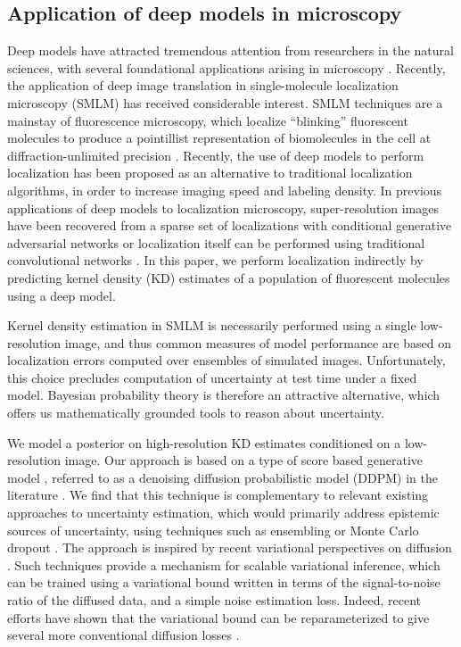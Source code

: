 \subsection{Application of deep models in microscopy}

Deep models have attracted tremendous attention from researchers in the natural sciences, with several foundational applications arising in microscopy \parencite{Weigert2018,Falk2019}. Recently, the application of deep image translation in single-molecule localization microscopy (SMLM) has received considerable interest. SMLM techniques are a mainstay of fluorescence microscopy, which localize ``blinking'' fluorescent molecules to produce a pointillist representation of biomolecules in the cell at diffraction-unlimited precision \parencite{Rust2006,Betzig2006}. Recently, the use of deep models to perform localization has been proposed as an alternative to traditional localization algorithms, in order to increase imaging speed and labeling density. In previous applications of deep models to localization microscopy, super-resolution images have been recovered from a sparse set of localizations with conditional generative adversarial networks \parencite{Ouyang2018} or localization itself can be performed using traditional convolutional networks \parencite{Nehme2020,Speiser2021}. In this paper, we perform localization indirectly by predicting kernel density (KD) estimates of a population of fluorescent molecules using a deep model. 

Kernel density estimation in SMLM is necessarily performed using a single low-resolution image, and thus common measures of model performance are based on localization errors computed over ensembles of simulated images. Unfortunately, this choice precludes computation of uncertainty at test time under a fixed model. Bayesian probability theory is therefore an attractive alternative, which offers us mathematically grounded tools to reason about uncertainty. 

We model a posterior on high-resolution KD estimates conditioned on a low-resolution image. Our approach is based on a type of score based generative model \parencite{Song2021}, referred to as a denoising diffusion probabilistic model (DDPM) in the literature \parencite{Ho2020,Song2021}. We find that this technique is complementary to relevant existing approaches to uncertainty estimation, which would primarily address epistemic sources of uncertainty, using techniques such as ensembling \parencite{Lakshminarayanan2017} or Monte Carlo dropout \parencite{Gal2022}. The approach is inspired by recent variational perspectives on diffusion \parencite{Dirmeier2023,Ribeiro2024,Kingma2021,Kingma2023}.  Such techniques provide a mechanism for scalable variational inference, which can be trained using a variational bound written in terms of the signal-to-noise ratio of the diffused data, and a simple noise estimation loss. Indeed, recent efforts have shown that the variational bound can be reparameterized to give several more conventional diffusion losses \parencite{Kingma2021,Kingma2023,Ribeiro2024}. 

